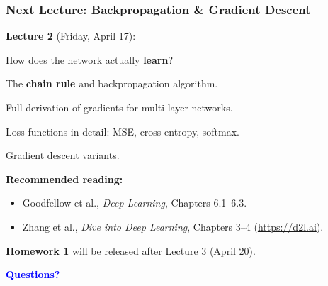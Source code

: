 \documentclass[notes,11pt, aspectratio=169]{beamer}
\newenvironment{wideitemize}{\itemize\addtolength{\itemsep}{10pt}}{\enditemize}
\begin{document}
\begin{frame}
\frametitle{Next Lecture: Backpropagation \& Gradient Descent}

\textbf{Lecture 2} (Friday, April 17):
\begin{wideitemize}
    \item How does the network actually \textbf{learn}?
    \item The \textbf{chain rule} and backpropagation algorithm.
    \item Full derivation of gradients for multi-layer networks.
    \item Loss functions in detail: MSE, cross-entropy, softmax.
    \item Gradient descent variants.
\end{wideitemize}

\vspace{10pt}
\textbf{Recommended reading:}
\begin{itemize}
    \item Goodfellow et al., \textit{Deep Learning}, Chapters 6.1--6.3.
    \item Zhang et al., \textit{Dive into Deep Learning}, Chapters 3--4 (\url{https://d2l.ai}).
\end{itemize}

\vspace{10pt}
\textbf{Homework 1} will be released after Lecture 3 (April 20).

\vspace{6pt}
\begin{center}
\Large \textcolor{blue}{\textbf{Questions?}}
\end{center}
\end{frame}
\end{document}
